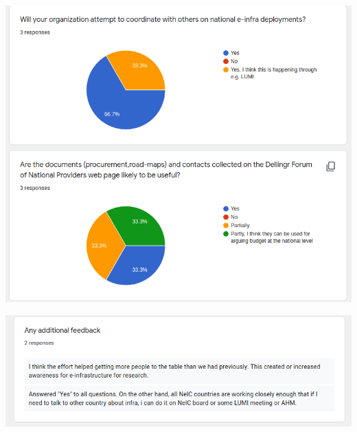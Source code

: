 \documentclass{article}
\begin{document}
\begin{appendices}
\begin{center}
\includegraphics[scale=0.6]{hlt_responses_2.png}
\end{center}

\begin{center}
\includegraphics[scale=0.6]{hlt_responses_3.png}
\end{center}

\newpage

\end{appendices}
\end{document}
